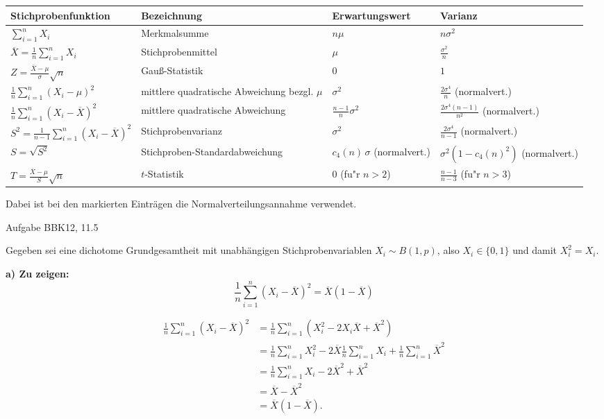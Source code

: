 \documentclass[a4paper]{article}
\begin{document}
\begin{center}
    \begin{tabular}{|l|l|l|l|}
        \hline
        \textbf{Stichprobenfunktion} & \textbf{Bezeichnung} & \textbf{Erwartungswert} & \textbf{Varianz} \\
        \hline
        $\sum_{i=1}^{n} X_i$ & Merkmalsumme & $n\mu$ & $n\sigma^2$ \\
        \hline
        $\overline{X}=\frac{1}{n}\sum_{i=1}^{n} X_i$ & Stichprobenmittel & $\mu$ & $\frac{\sigma^2}{n}$ \\
        \hline
        $Z=\frac{\overline{X}-\mu}{\sigma}\sqrt{n}$ & Gau\ss-Statistik & $0$ & $1$ \\
        \hline
        $\frac{1}{n}\sum_{i=1}^{n}(X_i-\mu)^2$ & mittlere quadratische Abweichung bezgl. $\mu$ & $\sigma^2$ & $\frac{2\sigma^4}{n}$ (normalvert.) \\
        \hline
        $\frac{1}{n}\sum_{i=1}^{n}(X_i-\overline{X})^2$ & mittlere quadratische Abweichung & $\frac{n-1}{n}\sigma^2$ & $\frac{2\sigma^4(n-1)}{n^2}$ (normalvert.) \\
        \hline
        $S^2=\frac{1}{n-1}\sum_{i=1}^{n}(X_i-\overline{X})^2$ & Stichprobenvarianz & $\sigma^2$ & $\frac{2\sigma^4}{n-1}$ (normalvert.) \\
        \hline
        $S=\sqrt{S^2}$ & Stichproben-Standardabweichung & $c_4(n)\,\sigma$ (normalvert.) & $\sigma^2(1-c_4(n)^2)$ (normalvert.) \\
        \hline
        $T=\frac{\overline{X}-\mu}{S}\sqrt{n}$ & $t$-Statistik & $0$ (fu"r $n>2$) & $\frac{n-1}{n-3}$ (fu"r $n>3$) \\
        \hline
    \end{tabular}
\end{center}

Dabei ist bei den markierten Einträgen die Normalverteilungsannahme verwendet.

Aufgabe BBK12, 11.5

Gegeben sei eine dichotome Grundgesamtheit mit unabhängigen Stichprobenvariablen
$X_i \sim B(1,p)$, also $X_i \in \{0,1\}$ und damit $X_i^2 = X_i$.

\textbf{a) Zu zeigen:}
\[
\frac{1}{n} \sum_{i=1}^{n} (X_i-\overline{X})^2 = \overline{X}(1-\overline{X})
\]

\begin{align*}
    \frac{1}{n} \sum_{i=1}^{n} (X_i-\overline{X})^2
    &= \frac{1}{n} \sum_{i=1}^{n} (X_i^2 - 2X_i\overline{X} + \overline{X}^2) \\
    &= \frac{1}{n} \sum_{i=1}^{n} X_i^2 - 2\overline{X}\frac{1}{n}\sum_{i=1}^{n} X_i + \frac{1}{n}\sum_{i=1}^{n} \overline{X}^2 \\
    &= \frac{1}{n} \sum_{i=1}^{n} X_i - 2\overline{X}^2 + \overline{X}^2 \\
    &= \overline{X} - \overline{X}^2 \\
    &= \overline{X}(1-\overline{X}).
\end{align*}
\end{document}
